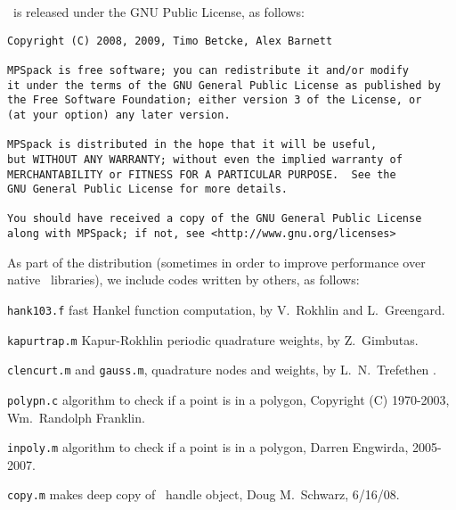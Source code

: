 \documentclass[12pt]{article}
\begin{document}
\mpspack\ is released under the GNU Public License, as follows:
\begin{verbatim}
Copyright (C) 2008, 2009, Timo Betcke, Alex Barnett

MPSpack is free software; you can redistribute it and/or modify
it under the terms of the GNU General Public License as published by
the Free Software Foundation; either version 3 of the License, or
(at your option) any later version.

MPSpack is distributed in the hope that it will be useful,
but WITHOUT ANY WARRANTY; without even the implied warranty of
MERCHANTABILITY or FITNESS FOR A PARTICULAR PURPOSE.  See the
GNU General Public License for more details.

You should have received a copy of the GNU General Public License
along with MPSpack; if not, see <http://www.gnu.org/licenses>
\end{verbatim}

As part of the distribution (sometimes in order to
improve performance over native \matlab\ libraries),
we include codes written by others, as follows:
\bi
\item {\tt hank103.f} fast Hankel function computation, by
V.~Rokhlin and L.~Greengard.
\item {\tt kapurtrap.m} Kapur-Rokhlin periodic quadrature weights,
by Z.~Gimbutas.
\item {\tt clencurt.m} and {\tt gauss.m}, quadrature nodes and weights,
by L.~N.~Trefethen \cite{tref}.
\item {\tt polypn.c} algorithm to check if a point is in a polygon,
Copyright (C) 1970-2003, Wm.~Randolph Franklin.
\item {\tt inpoly.m} algorithm to check if a point is in a polygon,
Darren Engwirda, 2005-2007.
\item {\tt copy.m} makes deep copy of \matlab\ handle object,
Doug M.~Schwarz, 6/16/08.
\ei





 

\end{document}
